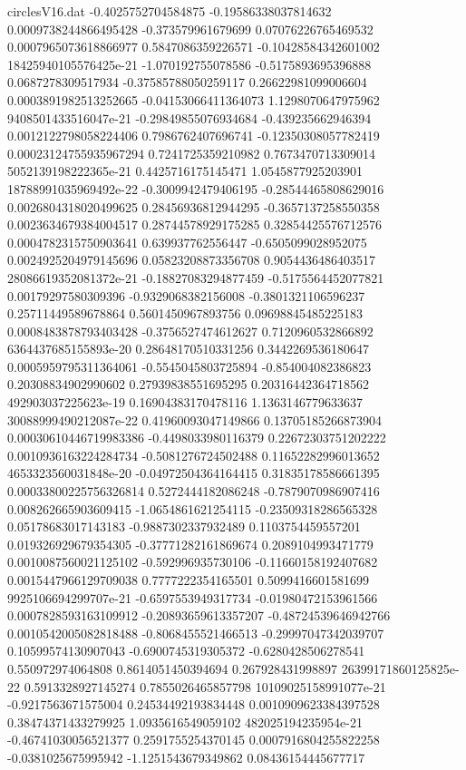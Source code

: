\begin{filecontents}{circlesV16.dat}
-0.4025752704584875	-0.19586338037814632	0.0009738244866495428
-0.373579961679699	0.07076226765469532	0.0007965073618866977
0.5847086359226571	-0.10428584342601002	18425940105576425e-21
-1.070192755078586	-0.5175893695396888	0.0687278309517934
-0.37585788050259117	0.26622981099006604	0.0003891982513252665
-0.04153066411364073	1.1298070647975962	9408501433516047e-21
-0.29849855076934684	-0.439235662946394	0.0012122798058224406
0.7986762407696741	-0.12350308057782419	0.00023124755935967294
0.7241725359210982	0.7673470713309014	5052139198222365e-21
0.4425716175145471	1.0545877925203901	18788991035969492e-22
-0.3009942479406195	-0.28544465808629016	0.0026804318020499625
0.28456936812944295	-0.3657137258550358	0.0023634679384004517
0.28744578929175285	0.32854425576712576	0.0004782315750903641
0.639937762556447	-0.6505099028952075	0.0024925204979145696
0.05823208873356708	0.9054436486403517	28086619352081372e-21
-0.18827083294877459	-0.5175564452077821	0.00179297580309396
-0.9329068382156008	-0.3801321106596237	0.25711449589678864
0.5601450967893756	0.09698845485225183	0.0008483878793403428
-0.3756527474612627	0.7120960532866892	6364437685155893e-20
0.28648170510331256	0.3442269536180647	0.0005959795311364061
-0.5545045803725894	-0.854004082386823	0.20308834902990602
0.27939838551695295	0.20316442364718562	492903037225623e-19
0.16904383170478116	1.1363146779633637	30088999490212087e-22
0.41960093047149866	0.13705185266873904	0.00030610446719983386
-0.4498033980116379	0.22672303751202222	0.0010936163224284734
-0.5081276724502488	0.11652282996013652	4653323560031848e-20
-0.04972504364164415	0.31835178586661395	0.00033800225756326814
0.5272444182086248	-0.7879070986907416	0.008262665903609415
-1.0654861621254115	-0.23509318286565328	0.05178683017143183
-0.9887302337932489	0.1103754459557201	0.019326929679354305
-0.37771282161869674	0.2089104993471779	0.0010087560021125102
-0.592996935730106	-0.11660158192407682	0.0015447966129709038
0.7777222354165501	0.5099416601581699	9925106694299707e-21
-0.6597553949317734	-0.01980472153961566	0.0007828593163109912
-0.20893659613357207	-0.48724539646942766	0.0010542005082818488
-0.8068455521466513	-0.29997047342039707	0.10599574130907043
-0.6900745319305372	-0.6280428506278541	0.550972974064808
0.8614051450394694	0.267928431998897	26399171860125825e-22
0.5913328927145274	0.7855026465857798	10109025158991077e-21
-0.9217563671575004	0.24534492193834448	0.0010909623384397528
0.38474371433279925	1.0935616549059102	482025194235954e-21
-0.46741030056521377	0.2591755254370145	0.0007916804255822258
-0.0381025675995942	-1.1251543679349862	0.08436154445677717

\end{filecontents}
